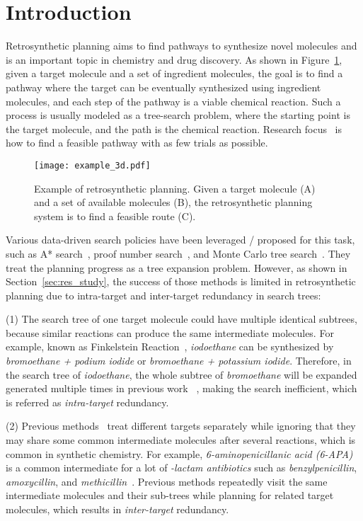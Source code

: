 \documentclass[sigconf]{acmart}
\begin{document}
\section{Introduction}
Retrosynthetic planning aims to find pathways to synthesize novel molecules and is an important topic in chemistry and drug discovery.
As shown in Figure~\ref{fig:intro}, given a target molecule and a set of ingredient molecules, the goal is to find a pathway where the target can be eventually synthesized using ingredient molecules, and each step of the pathway is a viable chemical reaction. Such a process is usually modeled as a tree-search problem, where the starting point is the target molecule, and the path is the chemical reaction.
Research focus~\cite{Chen2020,Kim2021,Hong2021} is how to find a feasible pathway with as few trials as possible.


\begin{figure}[!htbp]
\centering
\texttt{[image: example\_3d.pdf]}
\caption{Example of retrosynthetic planning. Given a target molecule (A) and a set of available molecules (B), the retrosynthetic planning system is to find a feasible route (C).}
\label{fig:intro}
\end{figure}


Various data-driven search policies have been leveraged / proposed for this task, such as A* search~\citep{Chen2020}, proof number search~\citep{kishimoto2019depth}, and Monte Carlo tree search~\citep{Hong2021}. They treat the planning progress as a tree expansion problem. 
However, as shown in Section~\ref{sec:res_study}, the success of those methods is limited  in retrosynthetic planning due to intra-target and inter-target redundancy in search trees:

(1) The search tree of one target molecule could have multiple identical subtrees, because similar reactions can produce the same intermediate molecules. For example, known as Finkelstein Reaction~\citep{finkelstein1910darstellung}, \textit{iodoethane} can be synthesized by \textit{bromoethane + podium iodide} or \textit{bromoethane + potassium iodide}. Therefore, in the search tree of \textit{iodoethane}, the whole subtree of \textit{bromoethane} will be expanded generated multiple times in previous work~\cite{Chen2020,Kim2021} , making the search inefficient, which is referred as \emph{intra-target} redundancy. 

(2) Previous methods~\cite{Chen2020,Kim2021} treat different targets separately while ignoring that they may share some common intermediate molecules after several reactions, which is common in synthetic chemistry.
For example, \textit{6-aminopenicillanic acid (6-APA)} is a common intermediate for a lot of \textit{-lactam antibiotics} such as \textit{benzylpenicillin}, \textit{amoxycillin}, and \textit{methicillin}~\cite{batchelor1959synthesis}.
Previous methods repeatedly visit the same intermediate molecules and their sub-trees while planning for related target molecules, which results in \emph{inter-target} redundancy.
\end{document}
